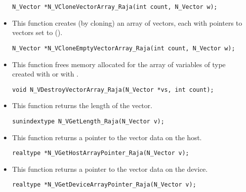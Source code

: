 \begin{itemize}
\begin{verbatim}
N_Vector *N_VCloneVectorArray_Raja(int count, N_Vector w);
\end{verbatim}


\item {}
 
  This function creates (by cloning) an array of  {\nvecraja} vectors,
  each with pointers to {\raja} vectors set to ().
 
\begin{verbatim}
N_Vector *N_VCloneEmptyVectorArray_Raja(int count, N_Vector w);
\end{verbatim}


\item {}
 
 This function frees memory allocated for the array of  variables of
 type  created with  or with
 .
 

 \verb|void N_VDestroyVectorArray_Raja(N_Vector *vs, int count);|


\item {}
 
 This function returns the length of the vector.

 \verb|sunindextype N_VGetLength_Raja(N_Vector v);|


\item {}
 
 This function returns a pointer to the vector data on the host.

 \verb|realtype *N_VGetHostArrayPointer_Raja(N_Vector v);|



\item {}
 
 This function returns a pointer to the vector data on the device.

 \verb|realtype *N_VGetDeviceArrayPointer_Raja(N_Vector v);|




\end{itemize}
